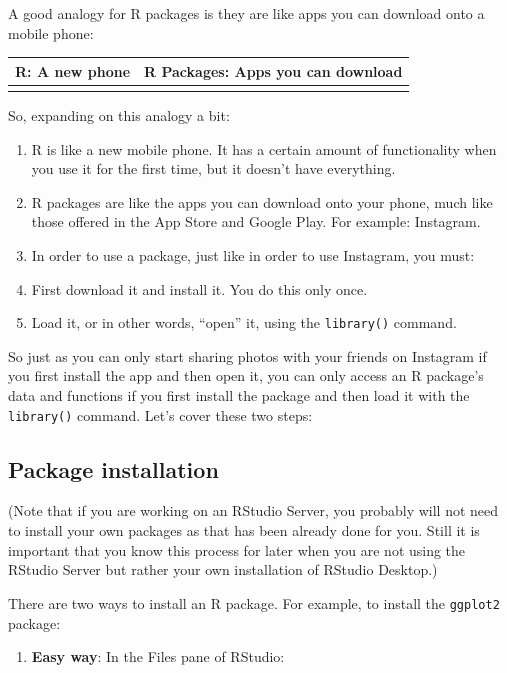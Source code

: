 \documentclass[
]{book}
\providecommand{\tightlist}{%
  \setlength{\itemsep}{0pt}\setlength{\parskip}{0pt}}
\begin{document}
A good analogy for R packages is they are like apps you can download onto a mobile phone:

\begin{longtable}[]{@{}cc@{}}
\toprule
R: A new phone & R Packages: Apps you can download\tabularnewline
\midrule
\endhead
&\tabularnewline
\bottomrule
\end{longtable}

So, expanding on this analogy a bit:

\begin{enumerate}
\def\labelenumi{\arabic{enumi}.}
\tightlist
\item
  R is like a new mobile phone. It has a certain amount of functionality when you use it for the first time, but it doesn't have everything.
\item
  R packages are like the apps you can download onto your phone, much like those offered in the App Store and Google Play. For example: Instagram.
\item
  In order to use a package, just like in order to use Instagram, you must:
\item
  First download it and install it. You do this only once.
\item
  Load it, or in other words, ``open'' it, using the \texttt{library()} command.
\end{enumerate}

So just as you can only start sharing photos with your friends on Instagram if you first install the app and then open it, you can only access an R package's data and functions if you first install the package and then load it with the \texttt{library()} command. Let's cover these two steps:

\hypertarget{package-installation}{%
\subsection{Package installation}\label{package-installation}}

(Note that if you are working on an RStudio Server, you probably will not need to install your own packages as that has been already done for you. Still it is important that you know this process for later when you are not using the RStudio Server but rather your own installation of RStudio Desktop.)

There are two ways to install an R package. For example, to install the \texttt{ggplot2} package:

\begin{enumerate}
\def\labelenumi{\arabic{enumi}.}
\tightlist
\item
  \textbf{Easy way}: In the Files pane of RStudio:
\end{enumerate}
\end{document}
